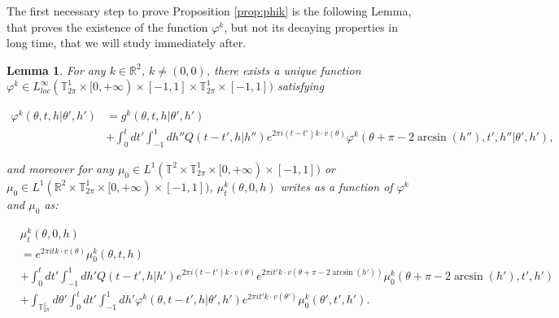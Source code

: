 \documentclass[a4paper,10pt,reqno]{amsart}
\newtheorem{lemma}{Lemma}[section]
\numberwithin{equation}{subsection}
\numberwithin{figure}{subsection}
\begin{document}
The first necessary step to prove Proposition \ref{prop:phik} is the following Lemma, that proves the existence of the function $\varphi^k$, but not its decaying properties in long time, that we will study immediately after.
\begin{lemma}\label{lemma:esphik}
For any $k\in\mathbb{R}^2$, $k\neq(0,0)$, there exists a unique function $\varphi^k\in L^{\infty}_{loc}(\mathbb{T}^1_{2\pi}\times[0,+\infty)\times[-1,1]\times\mathbb{T}^1_{2\pi}\times[-1,1])$ satisfying

{\tiny\begin{align}
\nonumber\varphi^k(\theta,t,h|\theta',h')&=g^k(\theta,t,h|\theta',h')
\\
\label{espr:phik}&+\int_0^tdt'\int_{-1}^1dh''Q(t-t',h|h'')e^{2\pi i(t-t')k\cdot v(\theta)}\varphi^k(\theta+\pi-2\arcsin(h''),t',h''|\theta',h'),
\end{align}}

and moreover for any $\mu_0\in L^1(\mathbb{T}^2\times\mathbb{T}^1_{2\pi}\times[0,+\infty)\times[-1,1])$ or $\mu_0\in L^1(\mathbb{R}^2\times\mathbb{T}^1_{2\pi}\times[0,+\infty)\times[-1,1])$, $\mu_t^k(\theta,0,h)$ writes as a function of $\varphi^k$ and $\mu_0$ as:

{\tiny\begin{align}
\nonumber&\mu_t^k(\theta,0,h)
\\
\nonumber&=e^{2\pi itk\cdot v(\theta)}\mu_0^k(\theta,t,h)
\\
\nonumber&+\int_0^tdt'\int_{-1}^1dh'Q(t-t',h|h')e^{2\pi i(t-t')k\cdot v(\theta)}e^{2\pi it' k\cdot v(\theta+\pi-2\arcsin(h'))}\mu_0^k(\theta+\pi-2\arcsin(h'),t',h')
\\
\label{rapp:nucleophik}&+\int_{\mathbb{T}^1_{2\pi}}d\theta'\int_0^tdt'\int_{-1}^1dh'\varphi^k(\theta,t-t',h|\theta',h')e^{2\pi it' k\cdot v(\theta')}\mu_0^k(\theta',t',h').
\end{align}}

\end{lemma}
\end{document}
